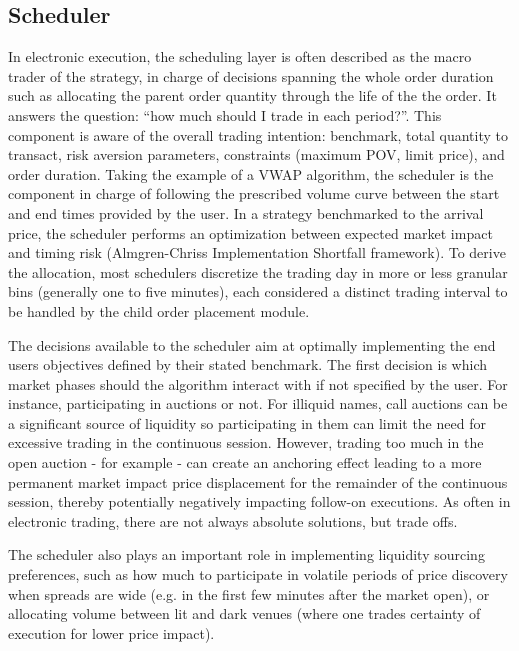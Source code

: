 \subsection{Scheduler}
In electronic execution, the scheduling layer is often described as the macro trader of the strategy, in charge of decisions spanning the whole order duration such as allocating the parent order quantity through the life of the the order. It answers the question: “how much should I trade in each period?”.
This component is aware of the overall trading intention: benchmark, total quantity to transact, risk aversion parameters, constraints (maximum POV, limit price), and order duration. Taking the example of a VWAP algorithm, the scheduler is the component in charge of following the prescribed volume curve between the start and end times provided by the user. In a strategy benchmarked to the arrival price, the scheduler performs an optimization between expected market impact and timing risk (Almgren-Chriss Implementation Shortfall framework). To derive the allocation, most schedulers discretize the trading day in more or less granular bins (generally one to five minutes), each considered a distinct trading interval to be handled by the child order placement module.

The decisions available to the scheduler aim at optimally implementing the end users objectives defined by their stated benchmark. The first decision is which market phases should the algorithm interact with if not specified by the user. For instance, participating in auctions or not. For illiquid names, call auctions can be a significant source of liquidity so participating in them can limit the need for excessive trading in the continuous session. However, trading too much in the open auction - for example - can create an anchoring effect leading to a more permanent market impact price displacement for the remainder of the continuous session, thereby potentially negatively impacting follow-on executions. As often in electronic trading, there are not always absolute solutions, but trade offs.

The scheduler also plays an important role in  implementing liquidity sourcing preferences, such as how much to participate in volatile periods of price discovery when spreads are wide (e.g. in the first few minutes after the market open), or allocating volume between lit and dark venues (where one trades certainty of execution for lower price impact).

